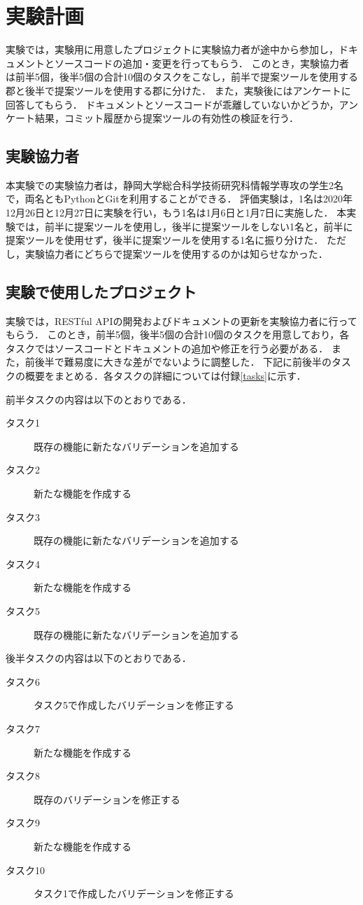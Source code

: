 \section{実験計画}
\label{plan}
実験では，実験用に用意したプロジェクトに実験協力者が途中から参加し，ドキュメントとソースコードの追加・変更を行ってもらう．
このとき，実験協力者は前半5個，後半5個の合計10個のタスクをこなし，前半で提案ツールを使用する郡と後半で提案ツールを使用する郡に分けた．
また，実験後にはアンケートに回答してもらう．
ドキュメントとソースコードが乖離していないかどうか，アンケート結果，コミット履歴から提案ツールの有効性の検証を行う．

\subsection{実験協力者}
本実験での実験協力者は，静岡大学総合科学技術研究科情報学専攻の学生2名で，両名ともPythonとGitを利用することができる．
評価実験は，1名は2020年12月26日と12月27日に実験を行い，もう1名は1月6日と1月7日に実施した．
本実験では，前半に提案ツールを使用し，後半に提案ツールをしない1名と，前半に提案ツールを使用せず，後半に提案ツールを使用する1名に振り分けた．
ただし，実験協力者にどちらで提案ツールを使用するのかは知らせなかった．

\subsection{実験で使用したプロジェクト}
実験では，RESTful APIの開発およびドキュメントの更新を実験協力者に行ってもらう．
このとき，前半5個，後半5個の合計10個のタスクを用意しており，各タスクではソースコードとドキュメントの追加や修正を行う必要がある．
また，前後半で難易度に大きな差がでないように調整した．
下記に前後半のタスクの概要をまとめる．各タスクの詳細については付録\ref{tasks}に示す．

前半タスクの内容は以下のとおりである．
\begin{description}
    \item[タスク1] 既存の機能に新たなバリデーションを追加する
    \item[タスク2] 新たな機能を作成する
    \item[タスク3] 既存の機能に新たなバリデーションを追加する
    \item[タスク4] 新たな機能を作成する
    \item[タスク5] 既存の機能に新たなバリデーションを追加する
\end{description}

後半タスクの内容は以下のとおりである．
\begin{description}
    \item[タスク6] タスク5で作成したバリデーションを修正する
    \item[タスク7] 新たな機能を作成する
    \item[タスク8] 既存のバリデーションを修正する
    \item[タスク9] 新たな機能を作成する
    \item[タスク10] タスク1で作成したバリデーションを修正する
\end{description}

